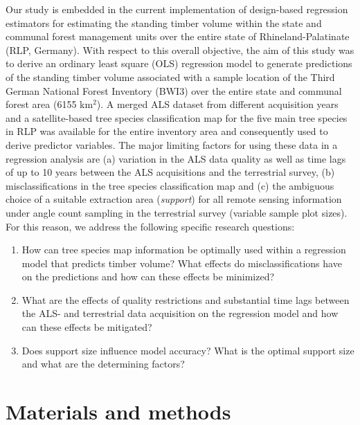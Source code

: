 Our study is embedded in the current implementation of design-based regression estimators \citep{mandallaz2013a, mandallaz2013b, mandallaz2013c} for estimating the standing timber volume within the state and communal forest management units over the entire state of Rhineland-Palatinate (RLP, Germany). With respect to this overall objective, the aim of this study was to derive an ordinary least square (OLS) regression model to generate predictions of the standing timber volume associated with a sample location of the Third German National Forest Inventory (BWI3) over the entire state and communal forest area (6155 km$^2$). A merged ALS dataset from different acquisition years and a satellite-based tree species classification map for the five main tree species in RLP was available for the entire inventory area and consequently used to derive predictor variables. The major limiting factors for using these data in a regression analysis are (a) variation in the ALS data quality as well as time lags of up to 10 years between the ALS acquisitions and the terrestrial survey, (b) misclassifications in the tree species classification map and (c) the ambiguous choice of a suitable extraction area (\textit{support}) for all remote sensing information under angle count sampling in the terrestrial survey (variable sample plot sizes). For this reason, we address the following specific research questions:

\begin{enumerate}
	\setlength\itemsep{1em}
	\item How can tree species map information be optimally used within a regression model that predicts timber volume? What effects do misclassifications have on the predictions and how can these effects be minimized?
	\item What are the effects of quality restrictions and substantial time lags between the ALS- and terrestrial data acquisition on the regression model and how can these effects be mitigated?
	\item Does support size influence model accuracy? What is the optimal support size and what are the determining factors?
\end{enumerate}


\section{Materials and methods}
\label{sec:MatMeth}

